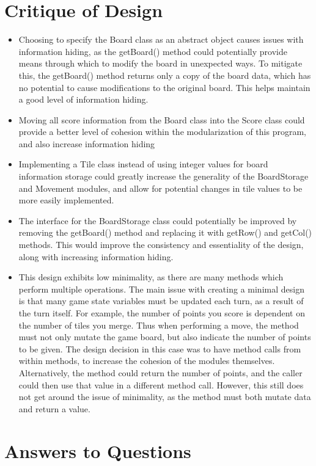\documentclass{article}
\begin{document}
\section{Critique of Design}
\begin{itemize}
	\item Choosing to specify the Board class as an abstract object causes issues with information hiding, as the getBoard() method could potentially provide means through which to modify the board in unexpected ways. To mitigate this, the getBoard() method returns only a copy of the board data, which has no potential to cause modifications to the original board. This helps maintain a good level of information hiding.
	\item Moving all score information from the Board class into the Score class could provide a better level of cohesion within the modularization of this program, and also increase information hiding
	\item Implementing a Tile class instead of using integer values for board information storage could greatly increase the generality of the BoardStorage and Movement modules, and allow for potential changes in tile values to be more easily implemented.
	\item The interface for the BoardStorage class could potentially be improved by removing the getBoard() method and replacing it with getRow() and getCol() methods. This would improve the consistency and essentiality of the design, along with increasing information hiding.
	\item This design exhibits low minimality, as there are many methods which perform multiple operations. The main issue with creating a minimal design is that many game state variables must be updated each turn, as a result of the turn itself. For example, the number of points you score is dependent on the number of tiles you merge. Thus when performing a move, the method must not only mutate the game board, but also indicate the number of points to be given. The design decision in this case was to have method calls from within methods, to increase the cohesion of the modules themselves. Alternatively, the method could return the number of points, and the caller could then use that value in a different method call. However, this still does not get around the issue of minimality, as the method must both mutate data and return a value.
\end{itemize}

\section{Answers to Questions}
\end{document}
